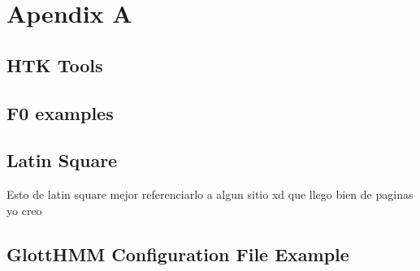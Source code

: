 \section{Apendix A}\label{ApA}
\subsection{HTK Tools}\label{htktools}
\subsection{F0 examples}\label{foestimation}
\subsection{Latin Square}
Esto de latin square mejor referenciarlo a algun sitio xd que llego bien de paginas yo creo
\subsection{GlottHMM Configuration File Example}\label{glottexp}